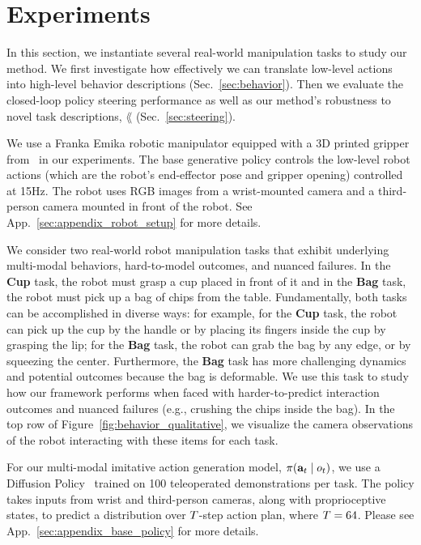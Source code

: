\section{Experiments}
\label{sec:experiments}
In this section, we instantiate several real-world manipulation tasks to study our method. 
We first investigate how effectively we can translate low-level actions into high-level behavior descriptions (Sec.~\ref{sec:behavior}).%
Then we evaluate the closed-loop policy steering performance as well as our method's robustness to novel task descriptions, $\lang$ (Sec.~\ref{sec:steering}). 


 We use a Franka Emika robotic manipulator equipped with a 3D printed gripper from~\citep{chi2024universal} in our experiments. 
The base generative policy controls the low-level robot actions (which are the robot's end-effector pose and gripper opening) controlled at 15Hz.
The robot uses RGB images from a wrist-mounted camera and a third-person camera mounted in front of the robot. See App.~\ref{sec:appendix_robot_setup} for more details.


    
 We consider two real-world robot manipulation tasks that exhibit underlying multi-modal behaviors, hard-to-model outcomes, and nuanced failures. 
In the \textbf{Cup} task, the robot must grasp a cup placed in front of it and in the \textbf{Bag} task, the robot must pick up a bag of chips from the table. 
Fundamentally, both tasks can be accomplished in diverse ways: for example, for the \textbf{Cup} task, the robot can pick up the cup by the handle or by placing its fingers inside the cup by grasping the lip; for the \textbf{Bag} task, the robot can grab the bag by any edge, or by squeezing the center. 
Furthermore, the \textbf{Bag} task has more challenging dynamics and potential outcomes because the bag is deformable. 
We use this task to study how our framework performs when faced with harder-to-predict interaction outcomes and nuanced failures (e.g., crushing the chips inside the bag). 
In the top row of Figure~\ref{fig:behavior_qualitative}, we visualize the camera observations of the robot interacting with these items for each task.





  
 For our multi-modal imitative action generation model, $\pi(\mathbf{a}_t \mid o_t)$, we use a Diffusion Policy~\citep{chi2024diffusionpolicy} trained on 100 teleoperated demonstrations per task. 
The policy takes inputs from wrist and third-person cameras, along with proprioceptive states, to predict a distribution over $T$-step action plan, where $T = 64$. Please see App.~\ref{sec:appendix_base_policy} for more details. %

